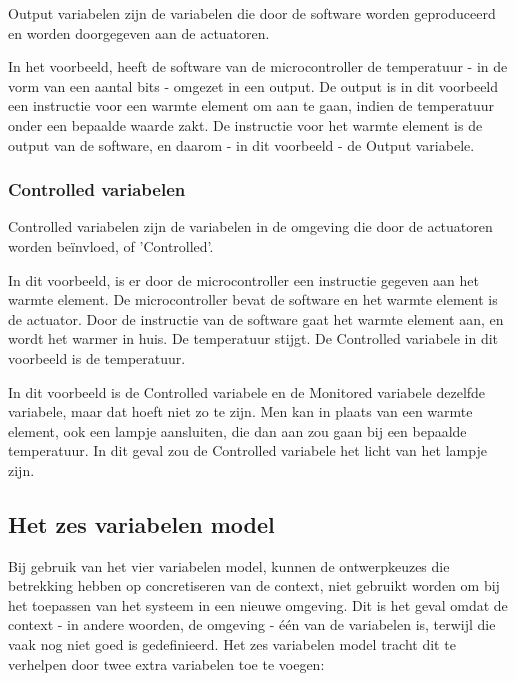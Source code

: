 \documentclass{article}
\begin{document}
			Output variabelen zijn de variabelen die door de software worden geproduceerd en worden doorgegeven aan de actuatoren. \par

			In het voorbeeld, heeft de software van de microcontroller de temperatuur - in de vorm van een aantal bits - omgezet in een output. De output is in dit voorbeeld een instructie voor een warmte element om aan te gaan, indien de temperatuur onder een bepaalde waarde zakt. De instructie voor het warmte element is de output van de software, en daarom - in dit voorbeeld - de Output variabele. \par

			\subsubsection{Controlled variabelen}

			Controlled variabelen zijn de variabelen in de omgeving die door de actuatoren worden beïnvloed, of 'Controlled'. \par

			In dit voorbeeld, is er door de microcontroller een instructie gegeven aan het warmte element. De microcontroller bevat de software en het warmte element is de actuator. Door de instructie van de software gaat het warmte element aan, en wordt het warmer in huis. De temperatuur stijgt. De Controlled variabele in dit voorbeeld is de temperatuur. \par

			
			In dit voorbeeld is de Controlled variabele en de Monitored variabele dezelfde variabele, maar dat hoeft niet zo te zijn. Men kan in plaats van een warmte element, ook een lampje aansluiten, die dan aan zou gaan bij een bepaalde temperatuur. In dit geval zou de Controlled variabele het licht van het lampje zijn. \par

		\subsection{Het zes variabelen model}

		Bij gebruik van het vier variabelen model, kunnen de ontwerpkeuzes die betrekking hebben op concretiseren van de context, niet gebruikt worden om bij het toepassen van het systeem in een nieuwe omgeving. Dit is het geval omdat de context - in andere woorden, de omgeving - één van de variabelen is, terwijl die vaak nog niet goed is gedefinieerd. Het zes variabelen model tracht dit te verhelpen door twee extra variabelen toe te voegen: \par
\end{document}
